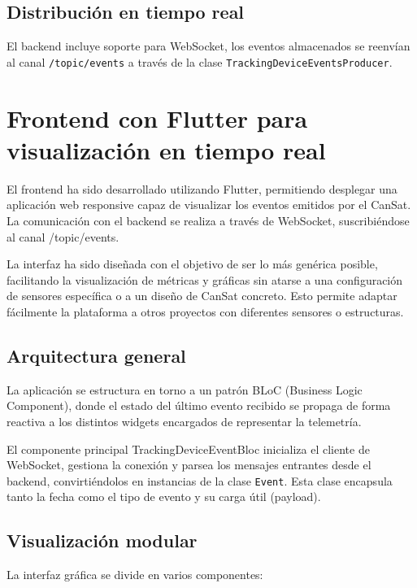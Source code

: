 \subsection{Distribución en tiempo real}

El backend incluye soporte para WebSocket, los eventos almacenados se reenvían al canal \texttt{/topic/events} a través de la clase \texttt{TrackingDeviceEventsProducer}.


\section{Frontend con Flutter para visualización en tiempo real}

El frontend ha sido desarrollado utilizando Flutter, permitiendo desplegar una aplicación web responsive capaz de visualizar los eventos emitidos por el CanSat.
La comunicación con el backend se realiza a través de WebSocket, suscribiéndose al canal /topic/events.

La interfaz ha sido diseñada con el objetivo de ser lo más genérica posible, facilitando la visualización de métricas y gráficas sin atarse a una configuración de sensores específica o a un diseño de CanSat concreto.
Esto permite adaptar fácilmente la plataforma a otros proyectos con diferentes sensores o estructuras.

\subsection{Arquitectura general}

La aplicación se estructura en torno a un patrón BLoC (Business Logic Component), donde el estado del último evento recibido se propaga de forma reactiva a los distintos widgets encargados de representar la telemetría.

El componente principal TrackingDeviceEventBloc inicializa el cliente de WebSocket, gestiona la conexión y parsea los mensajes entrantes desde el backend,
convirtiéndolos en instancias de la clase \texttt{Event}.
Esta clase encapsula tanto la fecha como el tipo de evento y su carga útil (payload).

\subsection{Visualización modular}

La interfaz gráfica se divide en varios componentes:

